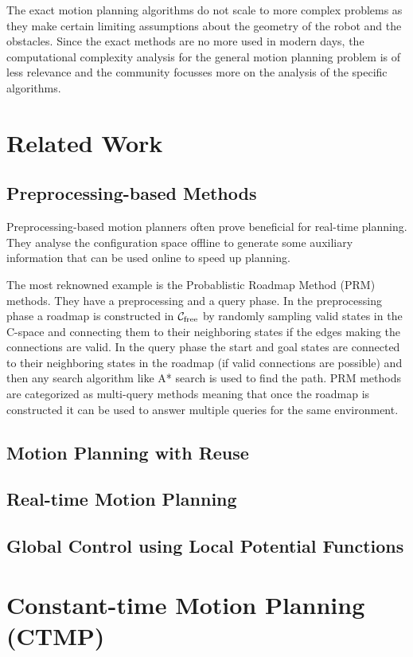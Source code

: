 \documentclass[a4paper,10pt]{article}
\begin{document}
The exact motion planning algorithms do not scale to more complex problems as they make certain limiting assumptions about the geometry of the robot and the obstacles. Since the exact methods are no more used in modern days, the computational complexity analysis for the general motion planning problem is of less relevance and the community focusses more on the analysis of the specific algorithms.

\section{Related Work}
\subsection{Preprocessing-based Methods}
Preprocessing-based motion planners often prove beneficial for real-time planning. They analyse the configuration space offline to generate some auxiliary information that can be used online to speed up planning. 

The most reknowned example is the Probablistic Roadmap Method (PRM)~\cite{kavraki1996probabilistic} methods. They have a preprocessing and a query phase. In the preprocessing phase a roadmap is constructed in $\mathcal{C}_{\rm free}$ by randomly sampling valid states in the C-space and connecting them to their neighboring states if the edges making the connections are valid. In the query phase the start and goal states are connected to their neighboring states in the roadmap (if valid connections are possible) and then any search algorithm like A* search is used to find the path. PRM methods are categorized as multi-query methods meaning that once the roadmap is constructed it can be used to answer multiple queries for the same environment.


\subsection{Motion Planning with Reuse}
\subsection{Real-time Motion Planning}
\subsection{Global Control using Local Potential Functions}

\section{Constant-time Motion Planning (CTMP)}
\end{document}
